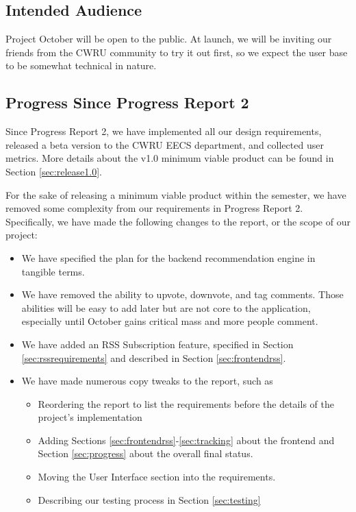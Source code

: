 \documentclass[11pt,letterpaper]{article}
\begin{document}
\subsection{Intended Audience}
Project October will be open to the public.
At launch, we will be inviting our friends from the CWRU community to try it out first, so we expect the user base to be somewhat technical in nature.

\subsection{Progress Since Progress Report 2}
Since Progress Report 2, we have implemented all our design requirements, released a beta version to the CWRU EECS department, and collected user metrics. More details about the v1.0 minimum viable product can be found in Section \ref{sec:release1.0}.

For the sake of releasing a minimum viable product within the semester, we have removed some complexity from our requirements in Progress Report 2. Specifically, we have made the following changes to the report, or the scope of our project:

\begin{itemize}
\item We have specified the plan for the backend recommendation engine in tangible terms.
\item We have removed the ability to upvote, downvote, and tag comments. Those abilities will be easy to add later but are not core to the application, especially until October gains critical mass and more people comment.
\item We have added an RSS Subscription feature, specified in Section \ref{sec:rssrequirements} and described in Section \ref{sec:frontendrss}.
\item We have made numerous copy tweaks to the report, such as
  \begin{itemize}
  \item Reordering the report to list the requirements before the details of the project's implementation
  \item Adding Sections \ref{sec:frontendrss}-\ref{sec:tracking} about the frontend and Section \ref{sec:progress} about the overall final status.
  \item Moving the User Interface section into the requirements.
  \item Describing our testing process in Section \ref{sec:testing}
  \end{itemize}
\end{itemize}
\end{document}
